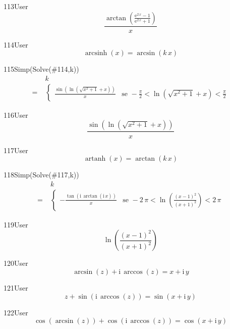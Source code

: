 \begin{espr}{113}{User}{}
\[
\frac{\arctan\!\left(\frac{\mathrm{e}^{2\, x} - 1}{\mathrm{e}^{2\, x} + 1}\right)}{x}
\]
\end{espr}
\begin{espr}{114}{User}{}
\[
\operatorname{arcsinh}\!\left(x\right) = \arcsin\!\left(k\, x\right)
\]
\end{espr}
\begin{espr}{115}{Simp(Solve(\#114,k))}{}
\begin{align*}
& k \\
=\;& \begin{cases} \frac{\sin\!\left(\ln\!\left(\sqrt{x^{2} + 1} + x\right)\right)}{x} & \text{se } -\frac{\pi}{2} < \ln\!\left(\sqrt{x^{2} + 1} + x\right) < \frac{\pi}{2} \end{cases}
\end{align*}
\end{espr}
\begin{espr}{116}{User}{}
\[
\frac{\sin\!\left(\ln\!\left(\sqrt{x^{2} + 1} + x\right)\right)}{x}
\]
\end{espr}
\begin{espr}{117}{User}{}
\[
\operatorname{artanh}\!\left(x\right) = \arctan\!\left(k\, x\right)
\]
\end{espr}
\begin{espr}{118}{Simp(Solve(\#117,k))}{}
\begin{align*}
& k \\
=\;& \begin{cases} -\frac{\tan\!\left(\mathrm{i}\, \arctan\!\left(\mathrm{i}\, x\right)\right)}{x} & \text{se } -2\, \pi < \ln\!\left(\frac{\left(x - 1\right)^{2}}{\left(x + 1\right)^{2}}\right) < 2\, \pi \end{cases}
\end{align*}
\end{espr}
\begin{espr}{119}{User}{}
\[
\ln\!\left(\frac{\left(x - 1\right)^{2}}{\left(x + 1\right)^{2}}\right)
\]
\end{espr}
\begin{espr}{120}{User}{}
\[
\arcsin\!\left(z\right) + \mathrm{i}\, \arccos\!\left(z\right) = x + \mathrm{i}\, y
\]
\end{espr}
\begin{espr}{121}{User}{}
\[
z + \sin\!\left(\mathrm{i}\, \arccos\!\left(z\right)\right) = \sin\!\left(x + \mathrm{i}\, y\right)
\]
\end{espr}
\begin{espr}{122}{User}{}
\[
\cos\!\left(\arcsin\!\left(z\right)\right) + \cos\!\left(\mathrm{i}\, \arccos\!\left(z\right)\right) = \cos\!\left(x + \mathrm{i}\, y\right)
\]
\end{espr}
